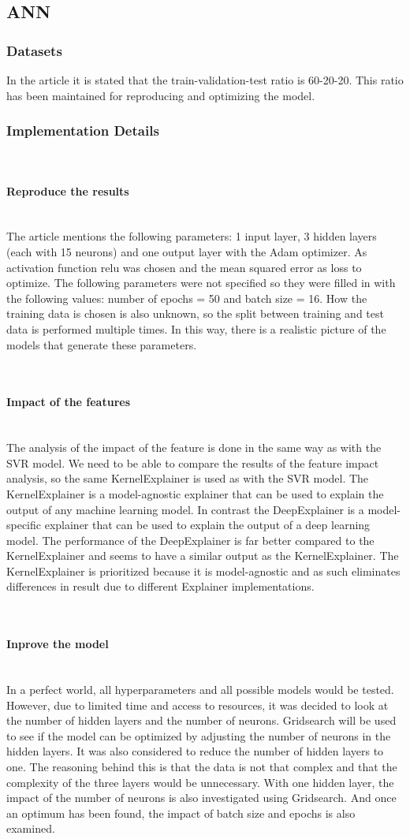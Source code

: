 \documentclass{article}
\newcommand{\subsubsubsection}[1]{%
  \paragraph{#1}\mbox{}\\}
\begin{document}
\subsection{ANN}

\subsubsection{Datasets}
In the article \cite{dahal2021prediction} it is stated that the train-validation-test ratio is 60-20-20. This ratio has been maintained for reproducing and optimizing the model.

\subsubsection{Implementation Details}

\subsubsubsection{Reproduce the results}
The article \cite{dahal2021prediction} mentions the following parameters: 1 input layer, 3 hidden layers (each with 15 neurons) and one output layer with the Adam optimizer.
As activation function relu was chosen and the mean squared error as loss to optimize. The following parameters were not specified so they were filled in with the following values: number of epochs = 50 and batch size = 16.
How the training data is chosen is also unknown, so the split between training and test data is performed multiple times. In this way, there is a realistic picture of the models that generate these parameters. 

\subsubsubsection{Impact of the features}
The analysis of the impact of the feature is done in the same way as with the SVR model.
We need to be able to compare the results of the feature impact analysis, so the same KernelExplainer is used as with the SVR model.
The KernelExplainer is a model-agnostic explainer that can be used to explain the output of any machine learning model.
In contrast the DeepExplainer is a model-specific explainer that can be used to explain the output of a deep learning model.
The performance of the DeepExplainer is far better compared to the KernelExplainer and seems to have a similar output as the KernelExplainer.
The KernelExplainer is prioritized because it is model-agnostic and as such eliminates differences in result due to different Explainer implementations.



\subsubsubsection{Inprove the model}
In a perfect world, all hyperparameters and all possible models would be tested. However, due to limited time and access to resources, it was decided to look at the number of hidden layers and the number of neurons.
Gridsearch will be used to see if the model can be optimized by adjusting the number of neurons in the hidden layers.
It was also considered to reduce the number of hidden layers to one. The reasoning behind this is that the data is not that complex and that the complexity of the three layers would be unnecessary. With one hidden layer, the impact of the number of neurons is also investigated using Gridsearch. And once an optimum has been found, the impact of batch size and epochs is also examined.
\end{document}
